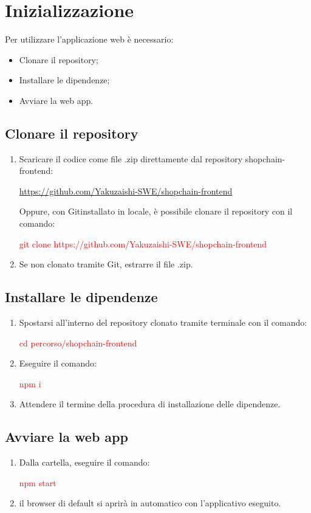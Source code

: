 \section{Inizializzazione}

Per utilizzare l’applicazione web è necessario:
\begin{itemize}
    \item Clonare il repository;
    \item Installare le dipendenze;
    \item Avviare la web app.
\end{itemize}


\subsection{Clonare il repository}

\begin{enumerate}
    \item Scaricare il codice come file .zip direttamente dal repository shopchain-frontend:
            \begin{center}
                \href{https://github.com/Yakuzaishi-SWE/shopchain-frontend}{https://github.com/Yakuzaishi-SWE/shopchain-frontend}
            \end{center}
            Oppure, con Git\glo installato in locale, è possibile clonare il repository con il comando:
            \begin{center}
                \textcolor{red}{git clone https://github.com/Yakuzaishi-SWE/shopchain-frontend}
            \end{center}
    \item Se non clonato tramite Git, estrarre il file .zip.
\end{enumerate}

\subsection{Installare le dipendenze}

\begin{enumerate}
    \item Spostarsi all'interno del repository clonato tramite terminale con il comando:
    \begin{center}
        \textcolor{red}{cd percorso/shopchain-frontend}
    \end{center}
    \item Eseguire il comando:
    \begin{center}
        \textcolor{red}{npm i}
    \end{center}
    \item Attendere il termine della procedura di installazione delle dipendenze.
\end{enumerate}

\subsection{Avviare la web app}

\begin{enumerate}
    \item Dalla cartella, eseguire il comando:
    \begin{center}
        \textcolor{red}{npm start}
    \end{center}
    \item il browser di default si aprirà in automatico con l'applicativo eseguito.
\end{enumerate}